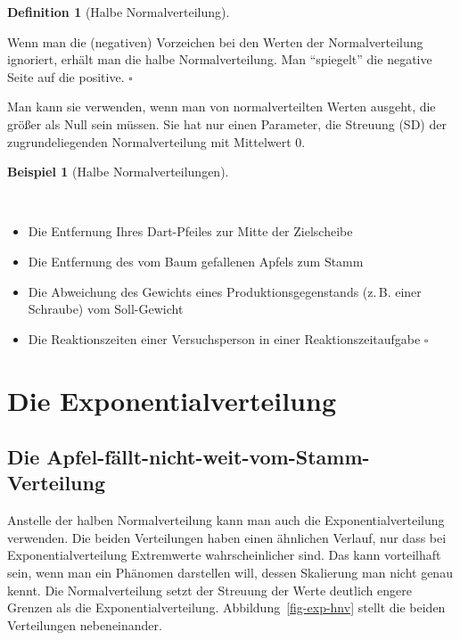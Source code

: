 \documentclass[
  ngerman,
  letterpaper,
  twoside,
  open=any]{scrbook}
\providecommand{\tightlist}{%
  \setlength{\itemsep}{0pt}\setlength{\parskip}{0pt}}\usepackage{longtable,booktabs,array}
\theoremstyle{definition}
\newtheorem{example}{Beispiel}[chapter]
\theoremstyle{plain}
\theoremstyle{definition}
\theoremstyle{definition}
\newtheorem{definition}{Definition}[chapter]
\theoremstyle{definition}
\newtheorem{example}{Beispiel}[chapter]
\theoremstyle{definition}
\theoremstyle{remark}
\begin{document}
\begin{definition}[Halbe
Normalverteilung]\protect\hypertarget{def-halbe-nv}{}\label{def-halbe-nv}

Wenn man die (negativen) Vorzeichen bei den Werten der Normalverteilung
ignoriert, erhält man die halbe Normalverteilung. Man \enquote{spiegelt}
die negative Seite auf die positive. \(\square\)

\end{definition}

Man kann sie verwenden, wenn man von normalverteilten Werten ausgeht,
die größer als Null sein müssen. Sie hat nur einen Parameter, die
Streuung (SD) der zugrundeliegenden Normalverteilung mit Mittelwert 0.

\begin{example}[Halbe
Normalverteilungen]\protect\hypertarget{exm-halbe-NV}{}\label{exm-halbe-NV}

~

\begin{itemize}
\tightlist
\item
  Die Entfernung Ihres Dart-Pfeiles zur Mitte der Zielscheibe
\item
  Die Entfernung des vom Baum gefallenen Apfels zum Stamm
\item
  Die Abweichung des Gewichts eines Produktionsgegenstands (z.\,B. einer
  Schraube) vom Soll-Gewicht
\item
  Die Reaktionszeiten einer Versuchsperson in einer Reaktionszeitaufgabe
  \(\square\)
\end{itemize}

\end{example}

\section{Die Exponentialverteilung}\label{die-exponentialverteilung}

\subsection{Die
Apfel-fällt-nicht-weit-vom-Stamm-Verteilung}\label{die-apfel-fuxe4llt-nicht-weit-vom-stamm-verteilung}

Anstelle der halben Normalverteilung kann man auch die
Exponentialverteilung verwenden. Die beiden Verteilungen haben einen
ähnlichen Verlauf, nur dass bei Exponentialverteilung Extremwerte
wahrscheinlicher sind. Das kann vorteilhaft sein, wenn man ein Phänomen
darstellen will, dessen Skalierung man nicht genau kennt. Die
Normalverteilung setzt der Streuung der Werte deutlich engere Grenzen
als die Exponentialverteilung. Abbildung~\ref{fig-exp-hnv} stellt die
beiden Verteilungen nebeneinander.
\end{document}
